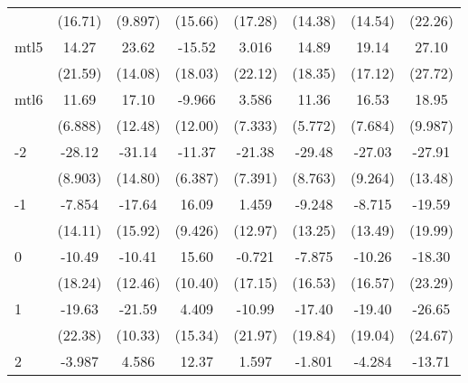 \documentclass{article}
\begin{document}
{\begin{longtable}{l*{7}{c}}
                &  (16.71)         &  (9.897)         &  (15.66)         &  (17.28)         &  (14.38)         &  (14.54)         &  (22.26)         \\
mtl5            &    14.27         &    23.62         &   -15.52         &    3.016         &    14.89         &    19.14         &    27.10         \\
                &  (21.59)         &  (14.08)         &  (18.03)         &  (22.12)         &  (18.35)         &  (17.12)         &  (27.72)         \\
mtl6            &    11.69         &    17.10         &   -9.966         &    3.586         &    11.36         &    16.53         &    18.95         \\
                &  (6.888)         &  (12.48)         &  (12.00)         &  (7.333)         &  (5.772)         &  (7.684)         &  (9.987)         \\
-2              &   -28.12\sym{**} &   -31.14         &   -11.37         &   -21.38\sym{*}  &   -29.48\sym{**} &   -27.03\sym{*}  &   -27.91         \\
                &  (8.903)         &  (14.80)         &  (6.387)         &  (7.391)         &  (8.763)         &  (9.264)         &  (13.48)         \\
-1              &   -7.854         &   -17.64         &    16.09         &    1.459         &   -9.248         &   -8.715         &   -19.59         \\
                &  (14.11)         &  (15.92)         &  (9.426)         &  (12.97)         &  (13.25)         &  (13.49)         &  (19.99)         \\
0               &   -10.49         &   -10.41         &    15.60         &   -0.721         &   -7.875         &   -10.26         &   -18.30         \\
                &  (18.24)         &  (12.46)         &  (10.40)         &  (17.15)         &  (16.53)         &  (16.57)         &  (23.29)         \\
1               &   -19.63         &   -21.59         &    4.409         &   -10.99         &   -17.40         &   -19.40         &   -26.65         \\
                &  (22.38)         &  (10.33)         &  (15.34)         &  (21.97)         &  (19.84)         &  (19.04)         &  (24.67)         \\
2               &   -3.987         &    4.586         &    12.37         &    1.597         &   -1.801         &   -4.284         &   -13.71         \\

\end{longtable}}
\end{document}
